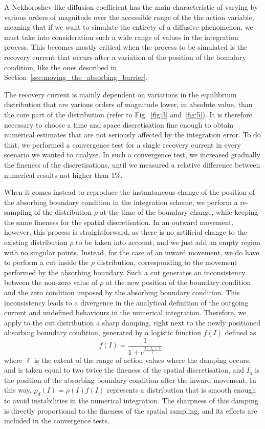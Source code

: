 {\begin{chapterappendices}
A Nekhoroshev-like diffusion coefficient has the main characteristic of varying by various orders of magnitude over the accessible range of the the action variable, meaning that if we want to simulate the entirety of a diffusive phenomenon, we must take into consideration such a wide range of values in the integration process. This becomes mostly critical when the process to be simulated is the recovery current that occurs after a variation of the position of the boundary condition, like the ones described in Section~\ref{sec:moving_the_absorbing_barrier}.

The recovery current is mainly dependent on variations in the equilibrium distribution that are various orders of magnitude lower, in absolute value, than the core part of the distribution (refer to Fig.~\ref{fig:3} and~\ref{fig:5}). It is therefore necessary to choose a time and space discretisation fine enough to obtain numerical estimates that are not seriously affected by the integration error. To do that, we performed a convergence test for a single recovery current in every scenario we wanted to analyse. In such a convergence test, we increased gradually the fineness of the discretisations, until we measured a relative difference between numerical results not higher than $1\%$.

When it comes instead to reproduce the instantaneous change of the position of the absorbing boundary condition in the integration scheme, we perform a re-sampling of the distribution $\rho$ at the time of the boundary change, while keeping the same fineness for the spatial discretisation. In an outward movement, however, this process is straightforward, as there is no artificial change to the existing distribution $\rho$ to be taken into account, and we just add an empty region with no singular points. Instead, for the case of an inward movement, we do have to perform a cut inside the $\rho$ distribution, corresponding to the movement performed by the absorbing boundary. Such a cut generates an inconsistency between the non-zero value of $\rho$ at the new position of the boundary condition and the zero condition imposed by the absorbing boundary condition. This inconsistency leads to a divergence in the analytical definition of the outgoing current and undefined behaviours in the numerical integration. Therefore, we apply to the cut distribution a sharp damping, right next to the newly positioned absorbing boundary condition, generated by a logistic function $f(I)$ defined as
\begin{equation}
    f(I) = \frac{1}{1 + e^{\frac{I-I_\text{a}+\ell}{\ell}}} \, , 
    \label{eq:logistic_damping}   
\end{equation}
where $\ell$ is the extent of the range of action values where the damping occurs, and is taken equal to two twice the fineness of the spatial discretisation, and $I_\text{a}$ is the position of the absorbing boundary condition after the inward movement. In this way, $\rho_d(I) = \rho(I) f(I)$ represents a distribution that is smooth enough to avoid instabilities in the numerical integration. The sharpness of this damping is directly proportional to the fineness of the spatial sampling, and its effects are included in the convergence tests.


\end{chapterappendices}}

